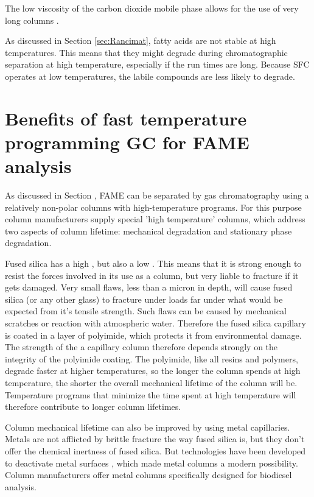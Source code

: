 The low viscosity of the carbon dioxide mobile phase allows for the use of very long
columns \autocite{Smith2001}.

As discussed in Section \ref{sec:Rancimat}, fatty acids are not stable at high
temperatures. This means that they might degrade during chromatographic
separation at high temperature, especially if the run times are long. Because
SFC operates at low temperatures, the labile compounds are less likely to degrade. 

\section[Benefits of fast GC]{Benefits of fast temperature programming GC for FAME analysis}

As discussed in Section \label{sec:ChromDet}, FAME can be separated by gas
chromatography using a relatively non-polar columns with high-temperature
programs. For this purpose column manufacturers supply special 'high
temperature' columns, which address two aspects of column lifetime: mechanical
degradation and stationary phase degradation. 

Fused silica has a high , but also a low
. This means that it is strong enough to resist the
forces involved in its use as a column, but very liable to fracture if it gets
damaged. Very small flaws, less than a micron in depth, will cause fused silica
(or any other glass) to fracture under loads far under what would be expected
from it's tensile strength. Such flaws can be caused by mechanical scratches or
reaction with atmospheric water. Therefore the fused silica capillary is coated
in a layer of polyimide, which protects it from environmental damage. The
strength of the a capillary column therefore depends strongly on the integrity
of the polyimide coating. The polyimide, like all resins and polymers, degrade
faster at higher temperatures, so the longer the column spends at high
temperature, the shorter the overall mechanical lifetime of the column will be.
Temperature programs that minimize the time spent at high temperature will
therefore contribute to longer column lifetimes.

Column mechanical lifetime can also be improved by using metal capillaries.
Metals are not afflicted by brittle fracture the way fused silica is, but they
don't offer the chemical inertness of fused silica. But technologies have been
developed to deactivate metal surfaces \autocite{Smith2002}, which made metal
columns a modern possibility. Column manufacturers offer metal columns
specifically designed for biodiesel analysis.

